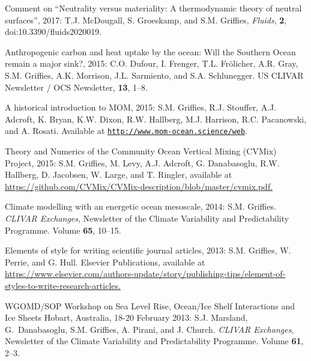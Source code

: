 \begin{etaremune}
\item Comment on ``Neutrality versus materiality: A thermodynamic theory of neutral surfaces'', 2017: T.J. McDougall, S. Groeskamp, and S.M. Grif\/fies, {\it Fluids}, {\bf 2},  doi:10.3390/fluids2020019.

\item Anthropogenic carbon and heat uptake by the ocean: Will the Southern Ocean remain a major sink?, 2015: C.O. Dufour, I. Frenger, T.L. Fr\"{o}licher, A.R. Gray, S.M. Grif\/f\/ies, A.K. Morrison, J.L. Sarmiento, and S.A. Schlunegger.  US CLIVAR Newsletter / OCS Newsletter, {\bf 13}, 1--8.

\item A historical introduction to MOM, 2015: S.M. Grif\/f\/ies, R.J. Stouffer, A.J. Adcroft, K. Bryan, K.W. Dixon, R.W. Hallberg, M.J. Harrison, R.C. Pacanowski, and A. Rosati.  Available at \href{\tt  http://www.mom-ocean.science/web/docs/project/mom_history_v15.09.05.pdf}{\tt http://www.mom-ocean.science/web}.
  
  
\item Theory and Numerics of the Community Ocean Vertical Mixing (CVMix) Project, 2015: S.M. Grif\/f\/ies, M. Levy, A.J. Adcroft, G. Danabasoglu, R.W. Hallberg, D. Jacobsen, W. Large, and T. Ringler, available at \\ \href{https://github.com/CVMix/CVMix-description/blob/master/cvmix.pdf}{https://github.com/CVMix/CVMix-description/blob/master/cvmix.pdf.}

\item Climate modelling with an energetic ocean mesoscale, 2014: S.M. Grif\/f\/ies.  {\em CLIVAR Exchanges}, Newsletter of the Climate Variability and Predictability Programme.  Volume {\bf 65}, 10--15.

\item Elements of style for writing scientific journal articles, 2013: S.M. Grif\/f\/ies, W. Perrie, and G. Hull. Elsevier Publications, available at \href{https://www.elsevier.com/authors-update/story/publishing-tips/element-of-styles-to-write-research-articles}{https://www.elsevier.com/authors-update/story/publishing-tips/element-of-styles-to-write-research-articles.}

\item WGOMD/SOP Workshop on Sea Level Rise, Ocean/Ice Shelf Interactions and Ice Sheets Hobart, Australia, 18-20 February 2013: S.J. Marsland, G.\ Danabasoglu, S.M. Grif\/f\/ies, A. Pirani, and J. Church.  {\em CLIVAR Exchanges}, Newsletter of the Climate Variability and Predictability Programme.  Volume {\bf 61}, 2--3.


\end{etaremune}
